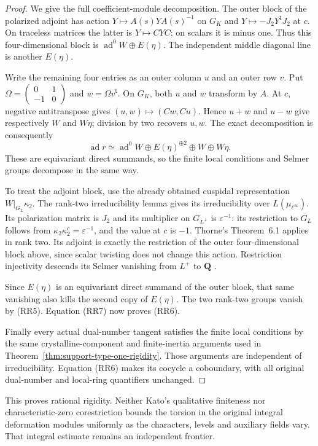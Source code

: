 \begin{proof}
We give the full coefficient-module decomposition.  The outer block
of the polarized adjoint has action $Y\mapsto A(s)YA(s)^{-1}$ on
$G_K$ and $Y\mapsto-J_2Y^{\mathsf t}J_2$ at $c$.  On traceless
matrices the latter is $Y\mapsto CYC$; on scalars it is minus one.
Thus this four-dimensional block is
$\operatorname{ad}^0W\oplus E(\eta)$.  The independent middle
diagonal line is another $E(\eta)$.

Write the remaining four entries as an outer column $u$ and an
outer row $v$.  Put
$\Omega=\left(\begin{smallmatrix}0&1\\-1&0\end{smallmatrix}\right)$
and $w=\Omega v^{\mathsf t}$.  On $G_K$, both $u$ and $w$ transform
by $A$.  At $c$, negative antitranspose gives
$(u,w)\mapsto(Cw,Cu)$.  Hence $u+w$ and $u-w$ give respectively
$W$ and $W\eta$; division by two recovers $u,w$.
The exact decomposition is consequently
\[
 \operatorname{ad}r\simeq
   \operatorname{ad}^0W\oplus E(\eta)^{\oplus2}
                  \oplus W\oplus W\eta.                        \tag{RR7}
\]
These are equivariant direct summands, so the finite local conditions
and Selmer groups decompose in the same way.

To treat the adjoint block, use the already obtained cuspidal
representation $W|_{G_L}\kappa_2$.  The rank-two irreducibility
lemma gives its irreducibility over $L(\mu_{\ell^\infty})$.
Its polarization matrix is $J_2$ and its multiplier on $G_{L^+}$
is $\varepsilon^{-1}$: its restriction to $G_L$ follows from
$\kappa_2\kappa_2^c=\varepsilon^{-1}$, and the value at $c$ is
$-1$.  Thorne's Theorem~6.1 applies in rank two.  Its adjoint is
exactly the restriction of the outer four-dimensional block above,
since scalar twisting does not change this action.  Restriction
injectivity descends its Selmer vanishing from $L^+$ to $\mathbf Q$
\cite{support-type-one-thorne}.

Since $E(\eta)$ is an equivariant direct summand of the outer
block, that same vanishing also kills the second copy of $E(\eta)$.
The two rank-two groups vanish by (RR5).  Equation (RR7) now proves
(RR6).

Finally every actual dual-number tangent satisfies the finite local
conditions by the same crystalline-component and finite-inertia
arguments used in Theorem~\ref{thm:support-type-one-rigidity}.
Those arguments are independent of irreducibility.  Equation (RR6)
makes its cocycle a coboundary, with all original dual-number and
local-ring quantifiers unchanged.
\end{proof}

This proves rational rigidity.  Neither Kato's qualitative
finiteness nor characteristic-zero corestriction bounds the torsion
in the original integral deformation modules uniformly as the
characters, levels and auxiliary fields vary.  That integral
estimate remains an independent frontier.
